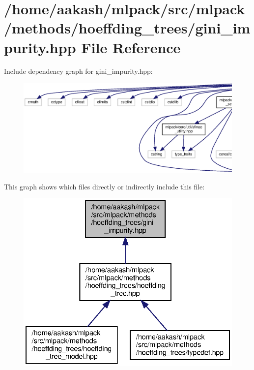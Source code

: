 \section{/home/aakash/mlpack/src/mlpack/methods/hoeffding\+\_\+trees/gini\+\_\+impurity.hpp File Reference}
\label{gini__impurity_8hpp}
Include dependency graph for gini\+\_\+impurity.\+hpp\+:
\nopagebreak
\begin{figure}[H]
\begin{center}
\leavevmode
\includegraphics[width=350pt]{gini__impurity_8hpp__incl}
\end{center}
\end{figure}
This graph shows which files directly or indirectly include this file\+:
\nopagebreak
\begin{figure}[H]
\begin{center}
\leavevmode
\includegraphics[width=332pt]{gini__impurity_8hpp__dep__incl}
\end{center}
\end{figure}
